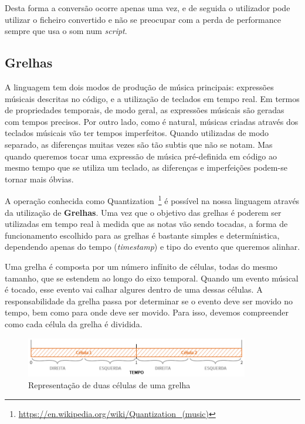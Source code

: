 Desta forma a conversão ocorre apenas uma vez, e de seguida o utilizador pode utilizar o ficheiro convertido e não se preocupar com a perda de performance sempre que usa o som num \textit{script}.

\subsection{Grelhas}
A linguagem tem dois modos de produção de música principais: expressões músicais descritas no código, e a utilização de teclados em tempo real. Em termos de propriedades temporais, de modo geral, as expressões músicais são geradas com tempos precisos. Por outro lado, como é natural, músicas criadas através dos teclados músicais vão ter tempos imperfeitos. Quando utilizadas de modo separado, as diferenças muitas vezes são tão subtis que não se notam. Mas quando queremos tocar uma expressão de música pré-definida em código ao mesmo tempo que se utiliza um teclado, as diferenças e imperfeições podem-se tornar mais óbvias\cite{doi:10.1177/1029864913486793}.

A operação conhecida como Quantization~\footnote{\url{https://en.wikipedia.org/wiki/Quantization_(music)}} é possível na nossa linguagem através da utilização de \textbf{Grelhas}. Uma vez que o objetivo das grelhas é poderem ser utilizadas em tempo real à medida que as notas vão sendo tocadas, a forma de funcionamento escolhido para as grelhas é bastante simples e determínistica, dependendo apenas do tempo (\textit{timestamp}) e tipo do evento que queremos alinhar.

Uma grelha é composta por um número infínito de células, todas do mesmo tamanho, que se estendem ao longo do eixo temporal. Quando um evento músical é tocado, esse evento vai calhar algures dentro de uma dessas células. A responsabilidade da grelha passa por determinar se o evento deve ser movido no tempo, bem como para onde deve ser movido. Para isso, devemos compreender como cada célula da grelha é dividida.

\begin{figure}[h]
\begin{center}
    \includegraphics[width=0.87\textwidth]{img/grids_1.png}
\end{center}
\caption{Representação de duas células de uma grelha}
\label{fig:grids-1}
\end{figure}

